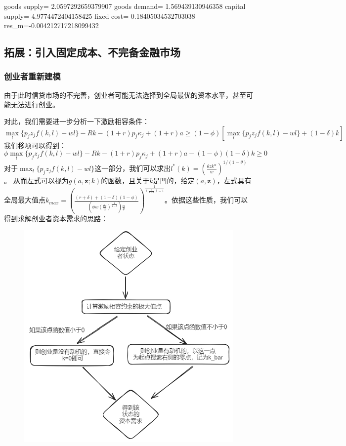 \documentclass[a4paper, 12pt]{ctexart}
\begin{document}
goods supply= 2.0597292659379907 goods demand= 1.569439130946358 capital supply= 4.9774472404158425 fixed cost= 0.18405034532703038 res\_m=-0.004212717218099432
\subsection{拓展：引入固定成本、不完备金融市场}
\subsubsection{创业者重新建模}
由于此时信贷市场的不完善，创业者可能无法选择到全局最优的资本水平，甚至可能无法进行创业。

对此，我们需要进一步分析一下激励相容条件：
$$\max_l \{ p_jz_jf(k,l)-wl \} -Rk-(1+r)p_j \kappa_j+(1+r)a \geq (1-\phi)[\max_l \{ p_jz_jf(k,l)-wl \}+(1-\delta)k]$$
我们移项可以得到：
$$\phi \max_l \{ p_jz_jf(k,l)-wl \} -Rk-(1+r)p_j \kappa_j+(1+r)a - (1-\phi)(1-\delta)k\geq 0$$
对于$\max_l \{ p_jz_jf(k,l)-wl \}$这一部分，我们可以求出$l^*(k)=(\frac{\theta z k^\alpha}{w})^{1/(1-\theta)}$。
从而左式可以视为$g(a,\mathbf{z};k)$的函数，且关于$k$是凹的，给定$(a,\mathbf{z})$，左式具有全局最大值点$k_{max}=\left( \frac{(r + \delta) + (1 - \delta)(1 - \phi)}{\left( \phi w \left( \frac{\theta z}{w} \right)^{\frac{1}{1 - \theta}} \right) \frac{\alpha}{\theta}} \right)^{\frac{1}{\left( \frac{\alpha}{1 - \theta} \right) - 1}}$。依据这些性质，我们可以得到求解创业者资本需求的思路：

\begin{figure}[h]
    \centering
    \includegraphics[width=0.8\linewidth]{pic/algor2.png}
    \nonumber
    \label{fig:enter-label}
\end{figure}
\end{document}
